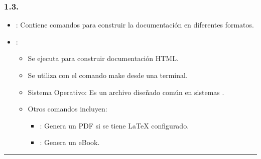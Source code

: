 \documentclass[a4paper,10pt,oneside,spanish,openany]{sphinxmanual}
\begin{document}
\subsubsection{1.3. }
\label{\detokenize{configuracion_inicial/004.estructura_inicial_proyecto:archivo-makefile}}\begin{itemize}
\item {} 
\sphinxAtStartPar
{}: Contiene comandos para construir la documentación en diferentes formatos.

\item {} 
\sphinxAtStartPar
{}:
\begin{itemize}
\item {} 
\sphinxAtStartPar
Se ejecuta  para construir documentación HTML.

\item {} 
\sphinxAtStartPar
Se utiliza con el comando make desde una terminal.

\item {} 
\sphinxAtStartPar
Sistema Operativo: Es un archivo diseñado común en sistemas .

\item {} 
\sphinxAtStartPar
Otros comandos incluyen:
\begin{itemize}
\item {} 
\sphinxAtStartPar
{}: Genera un PDF si se tiene LaTeX configurado.

\item {} 
\sphinxAtStartPar
{}: Genera un eBook.

\end{itemize}

\end{itemize}

\end{itemize}


\bigskip\hrule\bigskip
\end{document}
